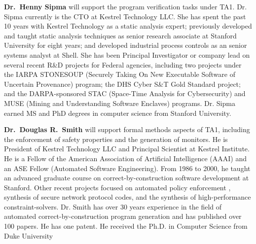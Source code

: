 \documentclass[12pt]{dod-blank}
\begin{document}
{\bf Dr.\ Henny Sipma} will support the program verification tasks under TA1.  %
Dr. Sipma currently is the CTO at Kestrel Technology LLC.  She has spent the past 10 years with Kestrel Technology as a static analysis expert; previously developed and taught static analysis techniques as senior research associate at Stanford University for eight years; and developed industrial process controls as an senior systems analyst at Shell.  She has been Principal Investigator or company lead on several recent R\&D projects for Federal agencies, including two projects under the IARPA STONESOUP (Securely Taking On New Executable Software of Uncertain Provenance) program; the DHS Cyber S\&T Gold Standard project; and the DARPA-sponsored STAC (Space-Time Analysis for Cybersecurity) and MUSE (Mining and Understanding Software Enclaves) programs.  Dr. Sipma earned 
MS and PhD degrees in computer science from Stanford University.  

{\bf Dr.\ Douglas R.\ Smith} will support formal methods aspects of TA1, including the enforcement of safety properties and the generation of monitors.  He is President of Kestrel Technology LLC and Principal Scientist at Kestrel Institute.  He is a Fellow of the American Association of Artificial Intelligence (AAAI) and an ASE Fellow (Automated Software Engineering).  From 1986 to 2000, he taught an advanced graduate course on correct-by-construction software development at Stanford.  
Other recent projects focused on automated policy enforcement \cite{SmithD0703,SmithD08}, synthesis of secure network protocol codes, and the synthesis of high-performance constraint-solvers\cite{SmithD08c,SmithD13}.  Dr. Smith has over 30 years experience in the field of automated correct-by-construction program generation and has published over 100 papers. He has one patent.  He received the Ph.D. in Computer Science from Duke University%
\end{document}
